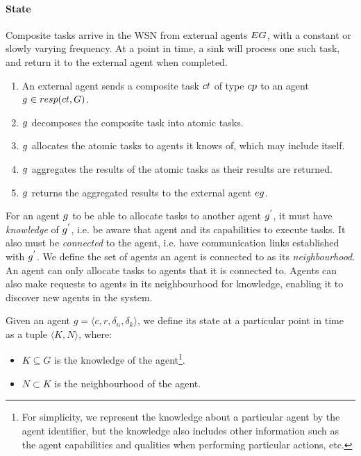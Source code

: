 \paragraph{State}

Composite tasks arrive in the WSN from external agents $\setExternalAgent{}{}$, with a constant or slowly varying frequency. At a point in time, a sink will process one such task, and return it to the external agent when completed.
\begin{enumerate}
	\item An external agent sends a composite task $\varCompositeTask{}{}$ of type $\varCompositeTaskType{}{}$ to an agent $\varAgent{}{} \in \functionTaskResponsibilities{}{}$. 
	\item $g_{}^{}$ decomposes the composite task into atomic tasks.
	\item $g_{}^{}$ allocates the atomic tasks to agents it knows of, which may include itself.
	\item $g_{}^{}$ aggregates the results of the atomic tasks as their results are returned.
	\item $g_{}^{}$ returns the aggregated results to the external agent $\varExternalAgent{}{}$.
\end{enumerate}

For an agent $g_{}^{}$ to be able to allocate tasks to another agent $g_{}^{'}$, it must have \textit{knowledge} of $g_{}^{'}$, i.e. be aware that agent and its capabilities to execute tasks. It also must be \textit{connected} to the agent, i.e. have communication links established with $g_{}^{'}$. We define the set of agents an agent is connected to as its \textit{neighbourhood}. An agent can only allocate tasks to agents that it is connected to. Agents can also make requests to agents in its neighbourhood for knowledge, enabling it to discover new agents in the system.
 

\begin{definition}
	\label{def:agent-state}
	Given an agent $g=\langle c, r, \delta_n, \delta_k \rangle$, we define its state at a particular point in time as a tuple $\langle K, N\rangle$, where:
	\begin{itemize}
		\item $K\subseteq G$ is the knowledge of the agent\footnote{For simplicity, we represent the knowledge about a particular agent by the agent identifier, but the knowledge also includes other information such as the agent capabilities and qualities when performing particular actions, etc. }.
		\item $N\subset K$ is the neighbourhood of the agent.
	\end{itemize}
\end{definition}




